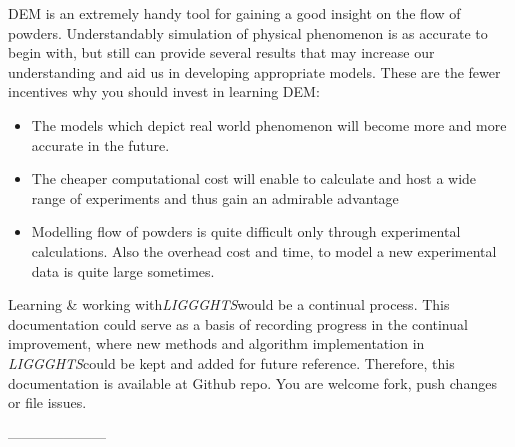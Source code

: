 \documentclass{tufte-book} %
\newcommand{\Li}{\textit{LIGGGHTS}}
\begin{document}
DEM is an extremely handy tool for gaining a good insight on the flow of powders. Understandably simulation of physical phenomenon is as accurate to begin with, but still can provide several results that may increase our understanding and aid us in developing appropriate models. These are the fewer incentives why you should invest in learning DEM:
\begin{itemize}
\item The models which depict real world phenomenon will become more and more accurate in the future. 
\item The cheaper computational cost will enable to calculate and host a wide range of experiments and thus gain an admirable advantage
\item Modelling flow of powders is quite difficult only through experimental calculations. Also the overhead cost and time, to model a new experimental data is quite large sometimes. 
\end{itemize}


Learning \& working with\Li would be a continual process. This documentation could serve as a basis of recording progress in the continual improvement, where new methods and algorithm implementation in \Li could be kept and added for future reference. Therefore, this documentation is available at Github repo. You are welcome fork, push changes or file issues.


 ---------------------



\printindex %
\end{document}
